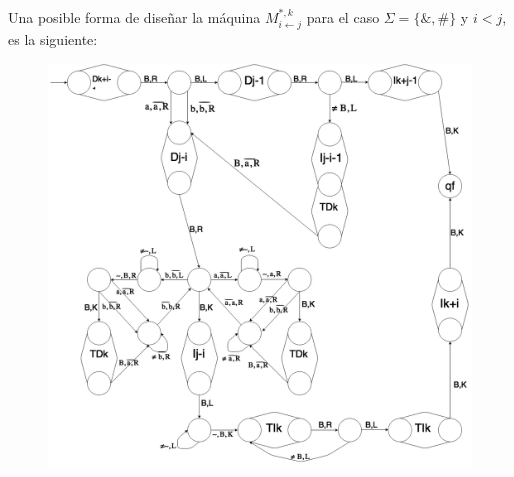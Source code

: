 \begin{frame}
  \PN Una posible forma de diseñar la máquina $M_{i \leftarrow j}^{\ast,k}$ para el caso $\Sigma = \{\&,\#\}$ y $i<j$,
  es la siguiente:
  \begin{figure}[h]
    \centering
    \includegraphics[scale=0.188]{graphics/figure_7.png}
  \end{figure}
\end{frame}
